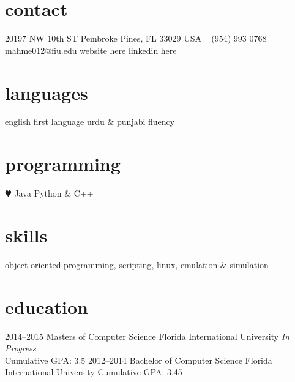 \documentclass[]{friggeri-cv} %
\begin{document}


\begin{aside} %
\section{contact}
20197 NW 10th ST
Pembroke Pines, FL 33029 
USA
~
(954) 993 0768 
~
mahme012@fiu.edu
website here
linkedin here
\section{languages}
english first language
urdu \& punjabi fluency
\section{programming}
{\color{red} $\varheartsuit$} Java
Python \& C++ 
\section{skills}
object-oriented programming,
scripting, linux, emulation \& simulation
\end{aside}


\section{education}

\begin{entrylist}
\entry
{2014--2015}
{Masters {\normalfont of Computer Science}}
{Florida International University}
{\emph{In Progress} \\
Cumulative GPA: 3.5}
\entry
{2012--2014}
{Bachelor {\normalfont of Computer Science}}
{Florida International University}
{Cumulative GPA: 3.45}
\end{entrylist}
\end{document}
